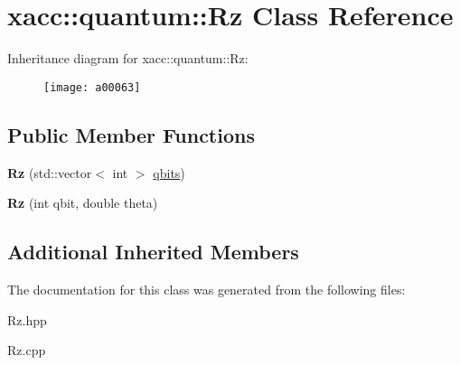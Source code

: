 \hypertarget{a00063}{}\section{xacc\+:\+:quantum\+:\+:Rz Class Reference}
\label{a00063}
Inheritance diagram for xacc\+:\+:quantum\+:\+:Rz\+:\begin{figure}[H]
\begin{center}
\leavevmode
\texttt{[image: a00063]}
\end{center}
\end{figure}
\subsection*{Public Member Functions}
\begin{DoxyCompactItemize}
\item 
{\bfseries Rz} (std\+::vector$<$ int $>$ \hyperlink{a00033_a2a56be6c2519ea65df4d06f4abae1393}{qbits})\hypertarget{a00063_a7ce912c7f9c9e8f4e7e60f9dba95538b}{}\label{a00063_a7ce912c7f9c9e8f4e7e60f9dba95538b}

\item 
{\bfseries Rz} (int qbit, double theta)\hypertarget{a00063_ae30eaf75feb8f896c22043629d21b834}{}\label{a00063_ae30eaf75feb8f896c22043629d21b834}

\end{DoxyCompactItemize}
\subsection*{Additional Inherited Members}


The documentation for this class was generated from the following files\+:\begin{DoxyCompactItemize}
\item 
Rz.\+hpp\item 
Rz.\+cpp\end{DoxyCompactItemize}
